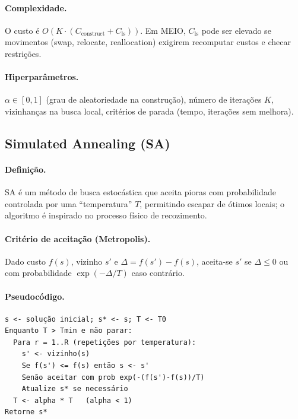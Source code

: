 \paragraph{Complexidade.}
O custo é \(O(K \cdot (C_{\text{construct}} + C_{\text{ls}}))\). Em MEIO, \(C_{\text{ls}}\) pode ser elevado se movimentos (swap, relocate, reallocation) exigirem recomputar custos e checar restrições.

\paragraph{Hiperparâmetros.}
\(\alpha\in[0,1]\) (grau de aleatoriedade na construção), número de iterações \(K\), vizinhanças na busca local, critérios de parada (tempo, iterações sem melhora). \cite{FeoResende1995GRASP}

\subsection{Simulated Annealing (SA)}

\paragraph{Definição.}
SA é um método de busca estocástica que aceita pioras com probabilidade controlada por uma ``temperatura'' \(T\), permitindo escapar de ótimos locais; o algoritmo é inspirado no processo físico de recozimento. \cite{Kirkpatrick1983SA}

\paragraph{Critério de aceitação (Metropolis).}
Dado custo \(f(s)\), vizinho \(s'\) e \(\Delta = f(s')-f(s)\), aceita-se \(s'\) se \(\Delta \le 0\) ou com probabilidade \(\exp(-\Delta/T)\) caso contrário. \cite{Kirkpatrick1983SA}

\paragraph{Pseudocódigo.}
\begin{verbatim}
s <- solução inicial; s* <- s; T <- T0
Enquanto T > Tmin e não parar:
  Para r = 1..R (repetições por temperatura):
    s' <- vizinho(s)
    Se f(s') <= f(s) então s <- s'
    Senão aceitar com prob exp(-(f(s')-f(s))/T)
    Atualize s* se necessário
  T <- alpha * T   (alpha < 1)
Retorne s*
\end{verbatim}

